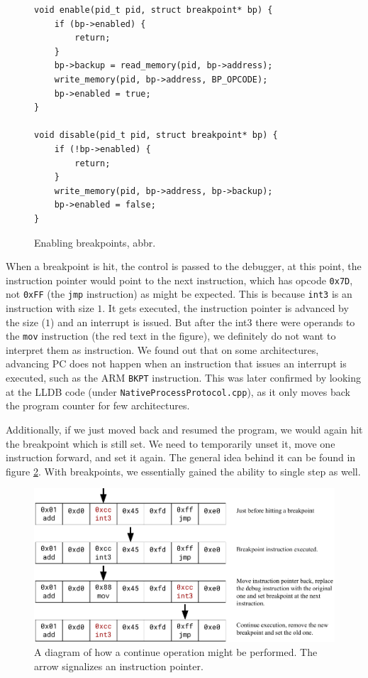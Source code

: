 \begin{figure}
    \begin{verbatim}
void enable(pid_t pid, struct breakpoint* bp) {
    if (bp->enabled) {
        return;
    }
    bp->backup = read_memory(pid, bp->address);
    write_memory(pid, bp->address, BP_OPCODE);
    bp->enabled = true;
}

void disable(pid_t pid, struct breakpoint* bp) {
    if (!bp->enabled) {
        return;
    }
    write_memory(pid, bp->address, bp->backup);
    bp->enabled = false;
}
    \end{verbatim}
    \caption{Enabling breakpoints, abbr.}
    \label{fig:breakpoint-enable}
\end{figure}

When a breakpoint is hit, the control is passed to the debugger, at this point,
the instruction pointer would point to the next instruction, which has opcode
\texttt{0x7D}, not \texttt{0xFF} (the \texttt{jmp} instruction) as might be
expected. This is because \texttt{int3} is an instruction with size $1$. It
gets executed, the instruction pointer is advanced by the size ($1$) and an
interrupt is issued. But after the int3 there were operands to the \texttt{mov}
instruction (the red text in the figure), we definitely do not want to
interpret them as instruction. We found out that on some architectures,
advancing PC does not happen when an instruction that issues an interrupt is
executed, such as the ARM \texttt{BKPT} instruction. This was later confirmed
by looking at the LLDB code (under
\verb|NativeProcessProtocol.cpp|), as it only moves back
the program counter for few architectures.

Additionally, if we just moved back and resumed the program, we would again hit
the breakpoint which is still set. We need to temporarily unset it, move one
instruction forward, and set it again. The general idea behind it can be found
in figure \ref{fig:continue}. With breakpoints, we essentially gained the
ability to single step as well.

\begin{figure}
    \centering
    \includegraphics[scale=0.5]{media/DIAGRAM}
    \caption{A diagram of how a continue operation might be performed. The
    arrow signalizes an instruction pointer.}
    \label{fig:continue}
\end{figure}

